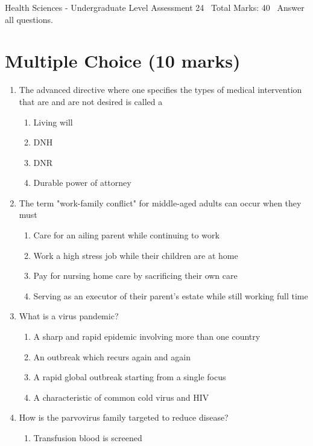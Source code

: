 \documentclass[12pt]{article}
\begin{document}
\begin{center}
Health Sciences - Undergraduate Level Assessment 24 \
Total Marks: 40 \
Answer all questions.
\end{center}

\section*{Multiple Choice (10 marks)}
\begin{enumerate}[label=\arabic*.]
\item The advanced directive where one specifies the types of medical intervention that are and are not desired is called a
\begin{enumerate}[label=(\alph*)]
    \item Living will
    \item DNH
    \item DNR
    \item Durable power of attorney
\end{enumerate}
\item The term "work-family conflict" for middle-aged adults can occur when they must
\begin{enumerate}[label=(\alph*)]
    \item Care for an ailing parent while continuing to work
    \item Work a high stress job while their children are at home
    \item Pay for nursing home care by sacrificing their own care
    \item Serving as an executor of their parent's estate while still working full time
\end{enumerate}
\item What is a virus pandemic?
\begin{enumerate}[label=(\alph*)]
    \item A sharp and rapid epidemic involving more than one country
    \item An outbreak which recurs again and again
    \item A rapid global outbreak starting from a single focus
    \item A characteristic of common cold virus and HIV
\end{enumerate}
\item How is the parvovirus family targeted to reduce disease?
\begin{enumerate}[label=(\alph*)]
    \item Transfusion blood is screened

\end{enumerate}
\end{enumerate}
\end{document}
